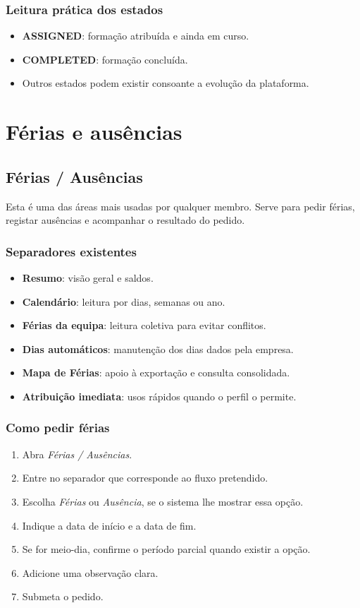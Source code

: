 \subsection{Leitura prática dos estados}
\begin{itemize}
  \item \textbf{ASSIGNED}: formação atribuída e ainda em curso.
  \item \textbf{COMPLETED}: formação concluída.
  \item Outros estados podem existir consoante a evolução da plataforma.
\end{itemize}

\chapter{Férias e ausências}
\section{Férias / Ausências}
Esta é uma das áreas mais usadas por qualquer membro. Serve para pedir férias, registar ausências e acompanhar o resultado do pedido.

\subsection{Separadores existentes}
\begin{itemize}
  \item \textbf{Resumo}: visão geral e saldos.
  \item \textbf{Calendário}: leitura por dias, semanas ou ano.
  \item \textbf{Férias da equipa}: leitura coletiva para evitar conflitos.
  \item \textbf{Dias automáticos}: manutenção dos dias dados pela empresa.
  \item \textbf{Mapa de Férias}: apoio à exportação e consulta consolidada.
  \item \textbf{Atribuição imediata}: usos rápidos quando o perfil o permite.
\end{itemize}

\subsection{Como pedir férias}
\begin{enumerate}
  \item Abra \textit{Férias / Ausências}.
  \item Entre no separador que corresponde ao fluxo pretendido.
  \item Escolha \textit{Férias} ou \textit{Ausência}, se o sistema lhe mostrar essa opção.
  \item Indique a data de início e a data de fim.
  \item Se for meio-dia, confirme o período parcial quando existir a opção.
  \item Adicione uma observação clara.
  \item Submeta o pedido.
\end{enumerate}

